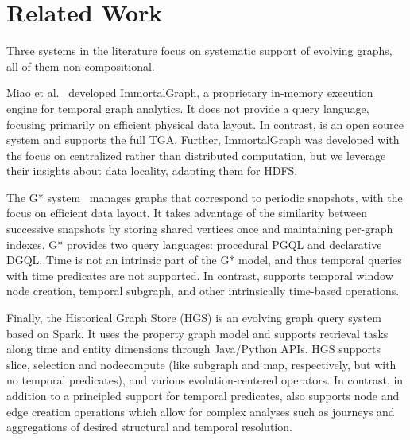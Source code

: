 \section{Related Work}
\label{sec:related}

Three systems in the literature focus on systematic support of
evolving graphs, all of them non-compositional.  

Miao et al.~\cite{Miao2015} developed ImmortalGraph, a proprietary
in-memory execution engine for temporal graph analytics.
It does not provide a query language, focusing
primarily on efficient physical data layout.  In contrast, \sys is an
open source system and supports the full TGA.  Further, ImmortalGraph was developed
with the focus on centralized rather than distributed computation, but
we leverage their insights about data locality, adapting them for
HDFS.

The G* system~\cite{Labouseur2015} manages graphs that correspond to
periodic snapshots, with the focus on efficient data layout.  It takes
advantage of the similarity between successive snapshots by storing
shared vertices once and maintaining per-graph indexes. G* provides
two query languages: procedural PGQL and declarative DGQL. Time is not
an intrinsic part of the G* model, and thus temporal queries with time
predicates are not supported.  In contrast, \sys supports temporal
window node creation, temporal subgraph, and other intrinsically
time-based operations.  

Finally, the Historical Graph Store (HGS) is an evolving graph query
system based on Spark.  It uses the property graph model and supports
retrieval tasks along time and entity dimensions through Java/Python
APIs.  HGS supports slice, selection and nodecompute (like \tga
subgraph and map, respectively, but with no temporal predicates), and
various evolution-centered operators.  In contrast, in addition to a
principled support for temporal predicates, \sys also supports node
and edge creation operations which allow for complex analyses such as
journeys and aggregations of desired structural and temporal
resolution.

